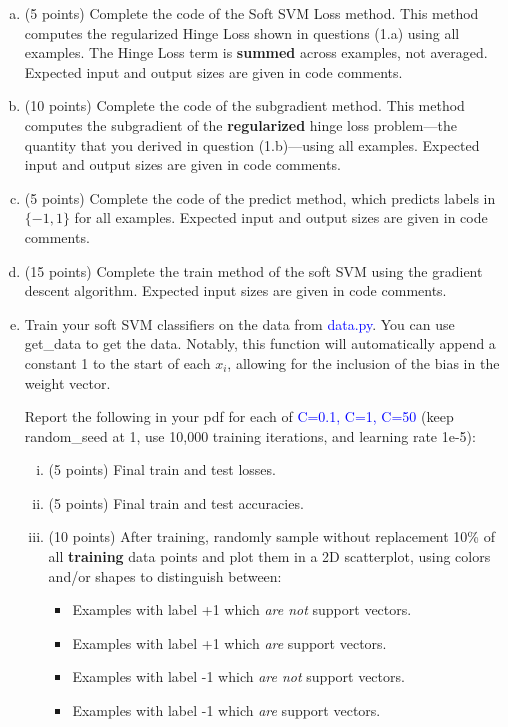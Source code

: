 \begin{enumerate}[(a)]

\item (5 points) Complete the code of the Soft SVM Loss method. This method computes the regularized Hinge Loss shown in questions (1.a) using all examples. The Hinge Loss term is \textbf{summed} across examples, not averaged. Expected input and output sizes are given in code comments.

\item (10 points) Complete the code of the subgradient method. This method computes the subgradient of the \textbf{regularized} hinge loss problem---the quantity that you derived in question (1.b)---using all examples. Expected input and output sizes are given in code comments.

\item (5 points) Complete the code of the predict method, which predicts labels in $\{-1,1\}$ for all examples. Expected input and output sizes are given in code comments.

\item (15 points) Complete the train method of the soft SVM using the gradient descent algorithm. Expected input sizes are given in code comments.

\item 

Train your soft SVM classifiers on the data from \textcolor{blue}{data.py}. You can use get\_data to get the data. Notably, this function will automatically append a constant 1 to the start of each $x_i$,  allowing for the inclusion of the bias in the weight vector.


Report the following in your pdf for each of  \textcolor{blue}{C=0.1,  C=1, C=50} (keep random\_seed at 1, use 10,000 training iterations, and learning rate 1e-5):

\begin{enumerate}[(i)]
\item (5 points) Final train and test losses.

\item (5 points) Final train and test accuracies.

\item (10 points) After training, randomly sample without replacement 10\% of all \textbf{training} data points and plot them in a 2D scatterplot, using colors and/or shapes to distinguish between:

\begin{itemize}
    \item Examples with label +1 which \textit{are not} support vectors.
    \item Examples with label +1 which \textit{are} support vectors.
    \item Examples with label -1 which \textit{are not} support vectors.
    \item Examples with label -1 which \textit{are} support vectors.
\end{itemize}


\end{enumerate}
\end{enumerate}
